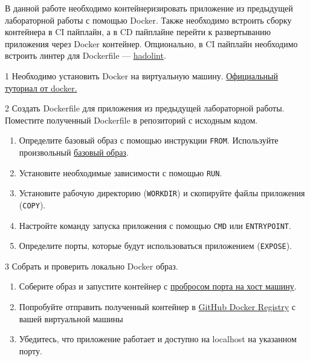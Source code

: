 \documentclass[12pt,a4paper]{article}
\begin{document}
В данной работе необходимо контейнеризировать приложение из предыдущей лабораторной работы с помощью Docker.
Также необходимо встроить сборку контейнера в CI пайплайн, а в CD пайплайне перейти к развертыванию приложения через Docker контейнер.
Опционально, в CI пайплайн необходимо встроить линтер для Dockerfile — \href{https://github.com/hadolint/hadolint}{hadolint}.

\begin{task}{1}
    Необходимо установить Docker на виртуальную машину. \href{https://docs.docker.com/engine/install/ubuntu/#install-using-the-repository}{Официальный туториал от docker.}
\end{task}

\begin{task}{2}
    Создать Dockerfile для приложения из предыдущей лабораторной работы. Поместите полученный Dockerfile в репозиторий с исходным кодом.

    \begin{enumerate}
        \item Определите базовый образ с помощью инструкции \texttt{FROM}. Используйте произвольный \href{https://docs.docker.com/build/building/base-images/}{базовый образ}.
        \item Установите необходимые зависимости с помощью \texttt{RUN}.
        \item Установите рабочую директорию (\texttt{WORKDIR}) и скопируйте файлы приложения (\texttt{COPY}).
        \item Настройте команду запуска приложения с помощью \texttt{CMD} или \texttt{ENTRYPOINT}.
        \item Определите порты, которые будут использоваться приложением (\texttt{EXPOSE}).
    \end{enumerate}
\end{task}

\begin{task}{3}
    Собрать и проверить локально Docker образ.

    \begin{enumerate}
        \item Соберите образ и запустите контейнер с \href{https://docs.docker.com/get-started/docker-concepts/running-containers/publishing-ports/}{пробросом порта на хост машину}.
        \item Попробуйте отправить полученный контейнер в \href{https://docs.github.com/en/packages/working-with-a-github-packages-registry/working-with-the-container-registry}{GitHub Docker Registry} с вашей виртуальной машины
        \item Убедитесь, что приложение работает и доступно на localhost на указанном порту.
    \end{enumerate}
\end{task}
\end{document}
